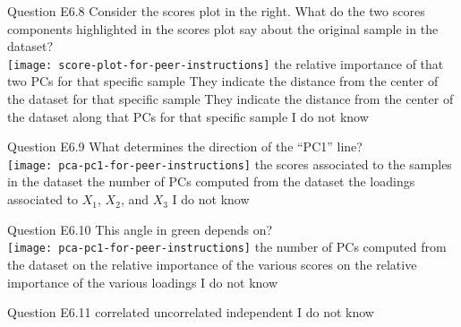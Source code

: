 \begin{frame}{Question E6.8}
	\QuestionBody
	{
		Consider the scores plot in the right. What do the two scores components highlighted in the scores plot say about the original sample in the dataset? \vspace{0.2cm} \\
		\centering
		\texttt{[image: score-plot-for-peer-instructions]}
	}
	\QuestionAnswers
	{
		\answer the relative importance of that two PCs for that specific sample   
		\answer They indicate the distance from the center of the dataset for that specific sample
		\correctanswer They indicate the distance from the center of the dataset along that PCs for that specific sample
		\answer I do not know
	}
	\QuestionSolution{}
\end{frame}


\begin{frame}{Question E6.9}
	\QuestionBody
	{
		What determines the direction of the ``PC1'' line? \vspace{0.2cm} \\
		\centering
		\texttt{[image: pca-pc1-for-peer-instructions]}
	}
	\QuestionAnswers
	{
		\answer the scores associated to the samples in the dataset
		\answer the number of PCs computed from the dataset
		\correctanswer the loadings associated to $X_1$, $X_2$, and $X_3$
		\answer I do not know
	}
	\QuestionSolution{}
\end{frame}


\begin{frame}{Question E6.10}
	\QuestionBody
	{
		This angle in green depends on? \vspace{0.2cm} \\
		\centering
		\texttt{[image: pca-pc1-for-peer-instructions]}
	}
	\QuestionAnswers
	{
		\answer the number of PCs computed from the dataset
		\answer on the relative importance of the various scores
		\correctanswer on the relative importance of the various loadings
		\answer I do not know
	}
	\QuestionSolution{}
\end{frame}


\begin{frame}{Question E6.11}
	\QuestionAnswers
	{
		\correctanswer correlated
		\answer uncorrelated
		\answer independent
		\answer I do not know
	}
	\QuestionSolution{}
\end{frame}


